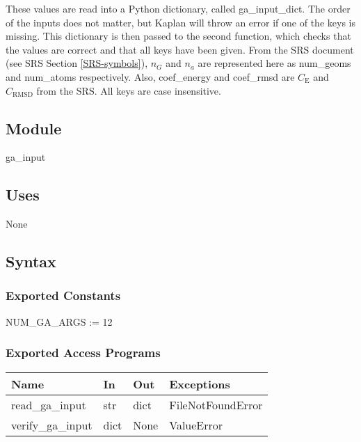 \documentclass[12pt, titlepage]{article}
\newcommand{\progname}{Kaplan}
\begin{document}
These values are read into a Python dictionary, called ga\_input\_dict. The 
order of the inputs does not matter, but \progname{} will throw an error if one 
of the keys is missing. This dictionary is then passed to the second function, 
which checks that the values are correct and that all keys have been given. 
From the SRS document (see SRS Section \ref{SRS-symbols}), $n_G$ and $n_a$ are 
represented here as num\_geoms and num\_atoms respectively. Also, coef\_energy 
and coef\_rmsd are $C_\text{E}$ and $C_\text{RMSD}$ from the SRS. All keys are 
case insensitive.


\subsection{Module}

ga\_input

\subsection{Uses}

None

\subsection{Syntax}

\subsubsection{Exported Constants}

NUM\_GA\_ARGS := 12

\subsubsection{Exported Access Programs}

\begin{table}[H]
	\begin{tabular}{p{4cm} p{2cm} p{2cm} p{5cm}}
		\toprule
		\textbf{Name} & \textbf{In} & \textbf{Out} & \textbf{Exceptions} \\
		\hline
		read\_ga\_input   & str  & dict & FileNotFoundError \\
		verify\_ga\_input & dict & None    & ValueError \\
		\bottomrule
	\end{tabular}
\end{table}
\end{document}

